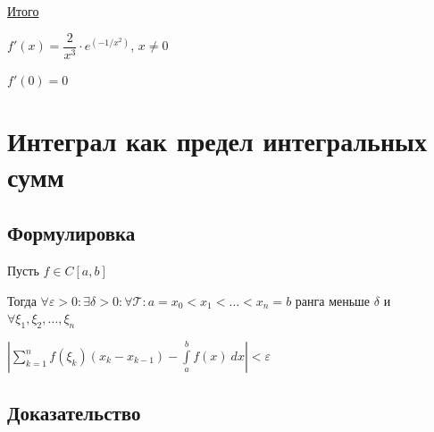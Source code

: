 \documentclass{article}
\begin{document}
			\underline{Итого}
			
			$f'(x) = \dfrac{2}{x^3} \cdot e^{\left(-1 / x^2\right)}$, $x \neq 0$
			
			$f'(0) = 0$
			
	\newpage

	\section{Интеграл как предел интегральных сумм}

		\subsection{Формулировка}

			Пусть $f \in C[a, b]$

			Тогда $\forall \varepsilon > 0 : \exists \delta > 0 : \forall \mathcal{T} : a = x_0 < x_1 < \ldots < x_n = b$ ранга меньше $\delta$ и $\forall \xi_1, \xi_2, \ldots, \xi_n$

			$\left| \sum\limits^n_{k = 1} f(\xi_k)(x_k - x_{k - 1}) - \int\limits^b_a f(x) \ dx \right| < \varepsilon$

		\subsection{Доказательство}
\end{document}
